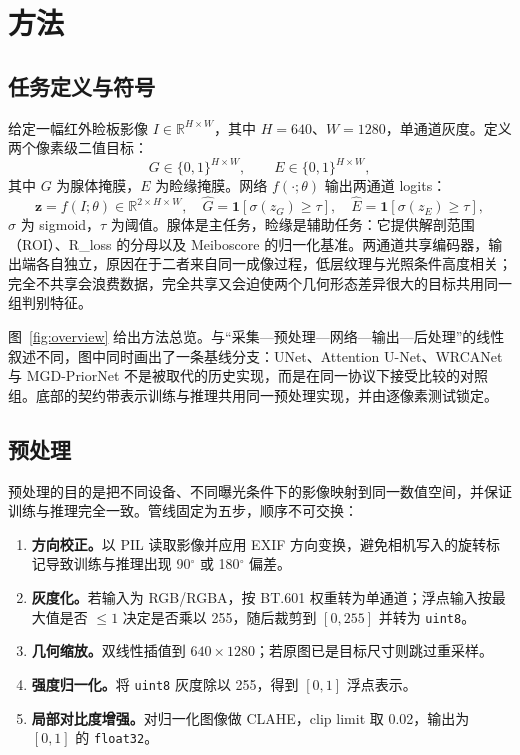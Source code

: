 \section{方法}\label{sec:method}

\subsection{任务定义与符号}

给定一幅红外睑板影像 $I\in\mathbb{R}^{H\times W}$，其中 $H=640$、$W=1280$，单通道灰度。定义两个像素级二值目标：
\begin{equation}
G\in\{0,1\}^{H\times W},\qquad E\in\{0,1\}^{H\times W},
\end{equation}
其中 $G$ 为腺体掩膜，$E$ 为睑缘掩膜。网络 $f(\cdot;\theta)$ 输出两通道 logits：
\begin{equation}
\mathbf{z}=f(I;\theta)\in\mathbb{R}^{2\times H\times W},\quad
\hat{G}=\mathbf{1}[\sigma(z_G)\ge \tau],\quad
\hat{E}=\mathbf{1}[\sigma(z_E)\ge \tau],
\end{equation}
$\sigma$ 为 sigmoid，$\tau$ 为阈值。腺体是主任务，睑缘是辅助任务：它提供解剖范围（ROI）、R\_loss 的分母以及 Meiboscore 的归一化基准。两通道共享编码器，输出端各自独立，原因在于二者来自同一成像过程，低层纹理与光照条件高度相关；完全不共享会浪费数据，完全共享又会迫使两个几何形态差异很大的目标共用同一组判别特征。

图~\ref{fig:overview} 给出方法总览。与“采集—预处理—网络—输出—后处理”的线性叙述不同，图中同时画出了一条基线分支：UNet、Attention U-Net、WRCANet 与 MGD-PriorNet 不是被取代的历史实现，而是在同一协议下接受比较的对照组。底部的契约带表示训练与推理共用同一预处理实现，并由逐像素测试锁定。



\subsection{预处理}

预处理的目的是把不同设备、不同曝光条件下的影像映射到同一数值空间，并保证训练与推理完全一致。管线固定为五步，顺序不可交换：

\begin{enumerate}[label=\textbf{P\arabic*.}]
\item \textbf{方向校正。}以 PIL 读取影像并应用 EXIF 方向变换，避免相机写入的旋转标记导致训练与推理出现 90$^\circ$ 或 180$^\circ$ 偏差。
\item \textbf{灰度化。}若输入为 RGB/RGBA，按 BT.601 权重转为单通道；浮点输入按最大值是否 $\le 1$ 决定是否乘以 255，随后裁剪到 $[0,255]$ 并转为 \texttt{uint8}。
\item \textbf{几何缩放。}双线性插值到 $640\times1280$；若原图已是目标尺寸则跳过重采样。
\item \textbf{强度归一化。}将 \texttt{uint8} 灰度除以 255，得到 $[0,1]$ 浮点表示。
\item \textbf{局部对比度增强。}对归一化图像做 CLAHE，clip limit 取 0.02，输出为 $[0,1]$ 的 \texttt{float32}。
\end{enumerate}

